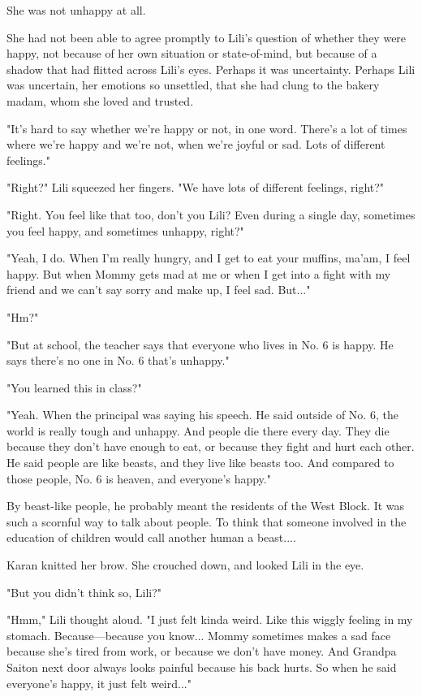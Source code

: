 She was not unhappy at all.

She had not been able to agree promptly to Lili's question of whether
they were happy, not because of her own situation or state-of-mind, but
because of a shadow that had flitted across Lili's eyes. Perhaps it was
uncertainty. Perhaps Lili was uncertain, her emotions so unsettled, that
she had clung to the bakery madam, whom she loved and trusted.

"It's hard to say whether we're happy or not, in one word. There's a lot
of times where we're happy and we're not, when we're joyful or sad. Lots
of different feelings."

"Right?" Lili squeezed her fingers. "We have lots of different feelings,
right?"

"Right. You feel like that too, don't you Lili? Even during a single
day, sometimes you feel happy, and sometimes unhappy, right?"

"Yeah, I do. When I'm really hungry, and I get to eat your muffins,
ma'am, I feel happy. But when Mommy gets mad at me or when I get into a
fight with my friend and we can't say sorry and make up, I feel sad.
But..."

"Hm?"

"But at school, the teacher says that everyone who lives in No. 6 is
happy. He says there's no one in No. 6 that's unhappy."

"You learned this in class?"

"Yeah. When the principal was saying his speech. He said outside of No.
6, the world is really tough and unhappy. And people die there every
day. They die because they don't have enough to eat, or because they
fight and hurt each other. He said people are like beasts, and they live
like beasts too. And compared to those people, No. 6 is heaven, and
everyone's happy."

By beast-like people, he probably meant the residents of the West Block.
It was such a scornful way to talk about people. To think that someone
involved in the education of children would call another human a
beast....

Karan knitted her brow. She crouched down, and looked Lili in the eye.

"But you didn't think so, Lili?"

"Hmm," Lili thought aloud. "I just felt kinda weird. Like this wiggly
feeling in my stomach. Because---because you know... Mommy sometimes makes
a sad face because she's tired from work, or because we don't have
money. And Grandpa Saiton next door always looks painful because his
back hurts. So when he said everyone's happy, it just felt weird..."

